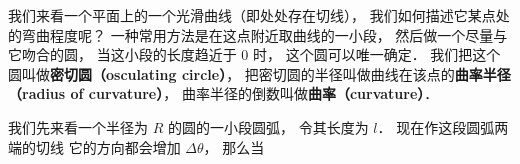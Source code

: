 

我们来看一个平面上的一个光滑曲线（即处处存在切线）， 我们如何描述它某点处的弯曲程度呢？ 一种常用方法是在这点附近取曲线的一小段， 然后做一个尽量与它吻合的圆， 当这小段的长度趋近于 0 时， 这个圆可以唯一确定． 我们把这个圆叫做\textbf{密切圆（osculating circle）}， 把密切圆的半径叫做曲线在该点的\textbf{曲率半径（radius of curvature）}， 曲率半径的倒数叫做\textbf{曲率（curvature）}．

我们先来看一个半径为 $R$ 的圆的一小段圆弧， 令其长度为 $l$． 现在作这段圆弧两端的切线 它的方向都会增加 $\Delta \theta$， 那么当
